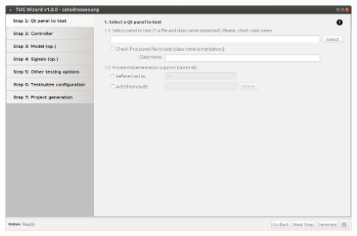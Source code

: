 \begin{enumerate}
\vspace{1ex}
\includegraphics[width=.95\textwidth]{images/tug013.png}
\vspace{3ex}
\end{enumerate}
\newpage




